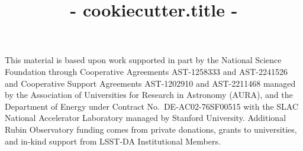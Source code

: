 \documentclass[11pt,twoside]{article}
\begin{document}

\title{ {{- cookiecutter.title -}} }








\acknowledgments This material is based upon work supported in part by the National Science Foundation through Cooperative Agreements AST-1258333 and AST-2241526 and Cooperative Support Agreements AST-1202910 and AST-2211468 managed by the Association of Universities for Research in Astronomy (AURA), and the Department of Energy under Contract No.\ DE-AC02-76SF00515 with the SLAC National Accelerator Laboratory managed by Stanford University.
Additional Rubin Observatory funding comes from private donations, grants to universities, and in-kind support from LSST-DA Institutional Members.


\end{document}
